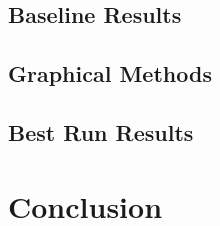 \documentclass{article}
\begin{document}
\subsection{Baseline Results}

\subsection{Graphical Methods}

\subsection{Best Run Results}

\section{Conclusion}
\end{document}
